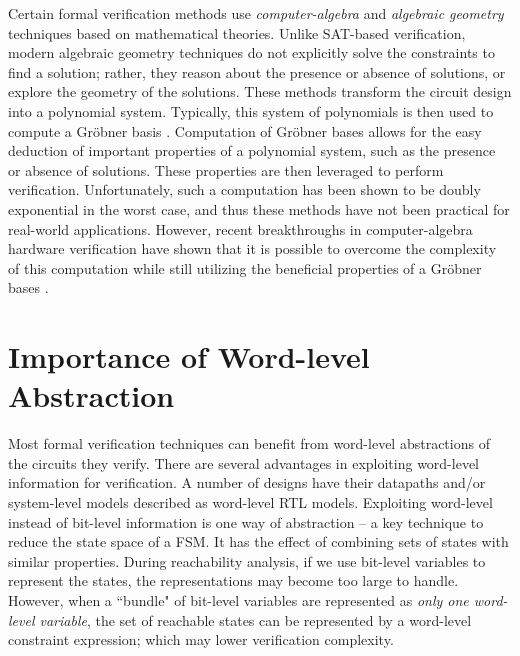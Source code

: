 Certain formal verification methods use \emph{computer-algebra} and \emph{algebraic
geometry} techniques based on mathematical theories.
Unlike SAT-based verification, modern algebraic geometry 
techniques do not explicitly solve the constraints to find a solution; 
rather, they reason about the presence or absence of solutions, or explore
the geometry of the solutions.
These methods \cite{Avrunin:CAV} \cite{condrat-tacas07} \cite{gbverify:2007} 
transform the circuit design into a polynomial system. Typically, this system
of polynomials is then used to compute a Gr\"obner basis \cite{gb_book}. 
Computation of Gr\"obner bases allows for 
the easy deduction of important properties of a polynomial system, 
such as the presence or absence of 
solutions. These properties are then leveraged to perform 
verification. Unfortunately, such a computation 
has been shown to be doubly 
exponential in the worst case, and thus these methods have not been 
practical for real-world applications. However, recent
breakthroughs in computer-algebra hardware verification have shown
that it is possible to overcome the complexity of this computation while
still utilizing the beneficial properties of a Gr\"obner bases
\cite{lv:phd}.

\section{Importance of Word-level Abstraction}
Most formal verification techniques can benefit from word-level abstractions 
of the circuits they verify.
There are several advantages in exploiting word-level information for
verification. A number of designs have  their
datapaths and/or system-level models described as word-level RTL
models.  Exploiting word-level instead of bit-level information is one
way of abstraction -- a key technique to reduce the state space of a
FSM. It has the effect of combining sets of states with similar 
properties. During reachability analysis, if we use bit-level
variables to  represent the states, the representations may become too
large to handle. However, when a ``bundle" of bit-level variables are
represented as {\it only one word-level variable}, the set of
reachable states can be represented by a  word-level constraint
expression; which may lower verification complexity.

